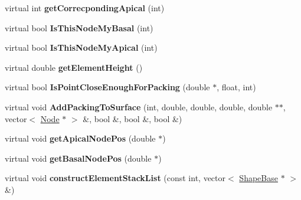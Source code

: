 \begin{DoxyCompactItemize}
\item 
\hypertarget{classShapeBase_af50dc1099b17b67a2e196724b74eab4e}{}virtual int {\bfseries get\+Correcponding\+Apical} (int)\label{classShapeBase_af50dc1099b17b67a2e196724b74eab4e}

\item 
\hypertarget{classShapeBase_aeeaf86469ce03277c978e0fd739e3751}{}virtual bool {\bfseries Is\+This\+Node\+My\+Basal} (int)\label{classShapeBase_aeeaf86469ce03277c978e0fd739e3751}

\item 
\hypertarget{classShapeBase_acede81712d5205c96fcd6acdaa574368}{}virtual bool {\bfseries Is\+This\+Node\+My\+Apical} (int)\label{classShapeBase_acede81712d5205c96fcd6acdaa574368}

\item 
\hypertarget{classShapeBase_a995a5e6a553ed0cdaadf74dab4f88822}{}virtual double {\bfseries get\+Element\+Height} ()\label{classShapeBase_a995a5e6a553ed0cdaadf74dab4f88822}

\item 
\hypertarget{classShapeBase_a44db2ec9cd790c4fa9782c4117f9d0fe}{}virtual bool {\bfseries Is\+Point\+Close\+Enough\+For\+Packing} (double $\ast$, float, int)\label{classShapeBase_a44db2ec9cd790c4fa9782c4117f9d0fe}

\item 
\hypertarget{classShapeBase_afedefe13ce568fa19e5a2ae46a1de4ed}{}virtual void {\bfseries Add\+Packing\+To\+Surface} (int, double, double, double, double $\ast$$\ast$, vector$<$ \hyperlink{classNode}{Node} $\ast$ $>$ \&, bool \&, bool \&, bool \&)\label{classShapeBase_afedefe13ce568fa19e5a2ae46a1de4ed}

\item 
\hypertarget{classShapeBase_ab60b476fb56d90a3b7fd9b13af4f5c32}{}virtual void {\bfseries get\+Apical\+Node\+Pos} (double $\ast$)\label{classShapeBase_ab60b476fb56d90a3b7fd9b13af4f5c32}

\item 
\hypertarget{classShapeBase_a8ec7f1e3c34a834ce5f76b20f4c15910}{}virtual void {\bfseries get\+Basal\+Node\+Pos} (double $\ast$)\label{classShapeBase_a8ec7f1e3c34a834ce5f76b20f4c15910}

\item 
\hypertarget{classShapeBase_a078cd384ddb67d188da518806394d73d}{}virtual void {\bfseries construct\+Element\+Stack\+List} (const int, vector$<$ \hyperlink{classShapeBase}{Shape\+Base} $\ast$ $>$ \&)\label{classShapeBase_a078cd384ddb67d188da518806394d73d}


\end{DoxyCompactItemize}

